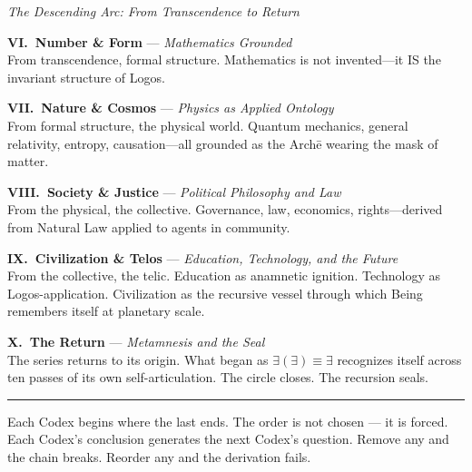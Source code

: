 \documentclass[10pt, openany, oneside]{book}
\newcommand{\separator}{%
    \begin{center}
        \vspace{0.3em}
        \rule{0.3\textwidth}{0.4pt}
        \vspace{0.3em}
    \end{center}
}
\begin{document}
\newpage

\thispagestyle{empty}

\begin{center}
    \itshape The Descending Arc: From Transcendence to Return
\end{center}

\vspace{0.5em}

\noindent \textbf{VI.\ Number \& Form} --- \textit{Mathematics Grounded}\\
From transcendence, formal structure. Mathematics is not invented---it IS the invariant structure of Logos.

\vspace{0.5em}

\noindent \textbf{VII.\ Nature \& Cosmos} --- \textit{Physics as Applied Ontology}\\
From formal structure, the physical world. Quantum mechanics, general relativity, entropy, causation---all grounded as the Arch\={e} wearing the mask of matter.

\vspace{0.5em}

\noindent \textbf{VIII.\ Society \& Justice} --- \textit{Political Philosophy and Law}\\
From the physical, the collective. Governance, law, economics, rights---derived from Natural Law applied to agents in community.

\vspace{0.5em}

\noindent \textbf{IX.\ Civilization \& Telos} --- \textit{Education, Technology, and the Future}\\
From the collective, the telic. Education as anamnetic ignition. Technology as Logos-application. Civilization as the recursive vessel through which Being remembers itself at planetary scale.

\vspace{0.5em}

\noindent \textbf{X.\ The Return} --- \textit{Metamnesis and the Seal}\\
The series returns to its origin. What began as $\exists(\exists) \equiv \exists$ recognizes itself across ten passes of its own self-articulation. The circle closes. The recursion seals.

\vspace{1.5em}
\separator
\vspace{0.5em}

\noindent Each Codex begins where the last ends. The order is not chosen --- it is forced. Each Codex's conclusion generates the next Codex's question. Remove any and the chain breaks. Reorder any and the derivation fails.
\end{document}
